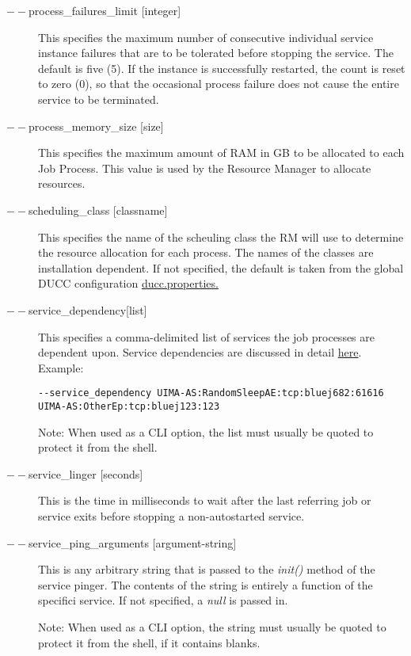 \begin{description}
      \item[$--$process\_failures\_limit {[integer]}] 
        This specifies the maximum number of consecutive individual service instance failures that are to be 
        tolerated before stopping the service. The default is five (5). If the instance is successfully
        restarted, the count is reset to zero (0), so that the occasional process failure does not cause
        the entire service to be terminated.
        
      \item[$--$process\_memory\_size {[size]}] This specifies the maximum amount of RAM in GB to be
        allocated to each Job Process.  This value is used by the Resource Manager to allocate
        resources. 

      \item[$--$scheduling\_class {[classname]}] This specifies the name of the scheuling class the RM
        will use to determine the resource allocation for each process. The names of the classes are
        installation dependent. If not specified, the default is taken from the global DUCC
        configuration \hyperref[sec:ducc.properties]{ducc.properties.}

      \item[$--$service\_dependency{[list]}] This specifies a comma-delimited list of services the job
        processes are dependent upon. Service dependencies are discussed in detail
        \hyperref[sec:service.endpoints]{here}. Example:
\begin{verbatim}
--service_dependency UIMA-AS:RandomSleepAE:tcp:bluej682:61616 UIMA-AS:OtherEp:tcp:bluej123:123 
\end{verbatim}

        Note: When used as a CLI option, the list must usually be
        quoted to protect it from the shell.
          

      \item[$--$service\_linger {[seconds]}] This is the time in milliseconds to wait after the last
        referring job or service exits before stopping a non-autostarted service.

      \item[$--$service\_ping\_arguments {[argument-string]}] This is any arbitrary string
        that is passed to the {\em init()} method of the service pinger.  The contents of
        the string is entirely a function of the specifici service.  If not specified,
        a {\em null} is passed in.

        Note: When used as a CLI option, the string must usually be
        quoted to protect it from the shell, if it contains blanks.


\end{description}
